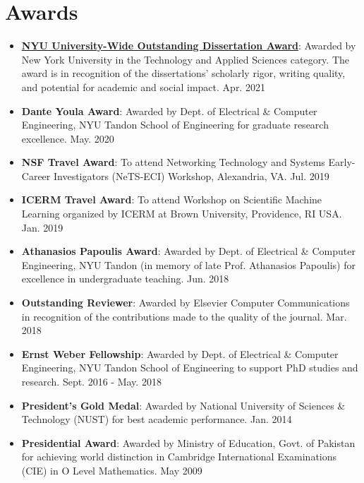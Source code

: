 \documentclass[letterpaper,11pt]{article}
\newcommand{\resumeItem}[2]{
  \item\small{
    \textbf{#1}{: #2 \vspace{-2pt}}
  }
}
\newcommand{\resumeSubItem}[2]{\resumeItem{#1}{#2}\vspace{-4pt}}
\newcommand{\resumeSubHeadingListStart}{\begin{itemize}[leftmargin=*]}
\newcommand{\resumeSubHeadingListEnd}{\end{itemize}}
\begin{document}
\section{Awards}
 \resumeSubHeadingListStart
 \justifying
    \resumeSubItem{\href{https://www.nyu.edu/students/communities-and-groups/graduate-students/doctoral-student-policies/nyu-university-wide-outstanding-dissertation-awards.html}{NYU University-Wide Outstanding Dissertation Award}}{Awarded by New York University in the Technology and Applied Sciences category. The award is in recognition of the dissertations' scholarly rigor, writing quality, and potential for academic and social impact. \hfill{Apr. 2021}}
    \resumeSubItem{Dante Youla Award}{Awarded by Dept. of Electrical \& Computer Engineering, NYU Tandon School of Engineering for graduate research excellence. \hfill{May. 2020}}
    \resumeSubItem{NSF Travel Award}{To attend Networking Technology and Systems Early-Career Investigators (NeTS-ECI) Workshop, Alexandria, VA. \hfill{Jul. 2019}}
    \resumeSubItem{ICERM Travel Award}{To attend Workshop on Scientific Machine Learning organized by ICERM at Brown University, Providence, RI USA. \hfill{Jan. 2019}}
    \resumeSubItem{Athanasios Papoulis Award}{Awarded by Dept. of Electrical \& Computer Engineering, NYU Tandon (in memory of late Prof. Athanasios Papoulis) for excellence in undergraduate teaching. \hfill{Jun. 2018}}
    \resumeSubItem{Outstanding Reviewer}{Awarded by Elsevier Computer Communications in recognition of the contributions made to the quality of the journal. \hfill{Mar. 2018}}
    \resumeSubItem{Ernst Weber Fellowship}{Awarded by Dept. of Electrical \& Computer Engineering, NYU Tandon School of Engineering to support PhD studies and research. \hfill{Sept. 2016 - May. 2018}}
    \resumeSubItem{President's Gold Medal}{Awarded by National University of Sciences \& Technology (NUST) for best academic performance. \hfill{Jan. 2014}}
    \resumeSubItem{Presidential Award}{Awarded by Ministry of Education, Govt. of Pakistan for achieving world distinction in Cambridge International Examinations (CIE) in O Level Mathematics. \hfill{May 2009}}
 \resumeSubHeadingListEnd

\end{document}
